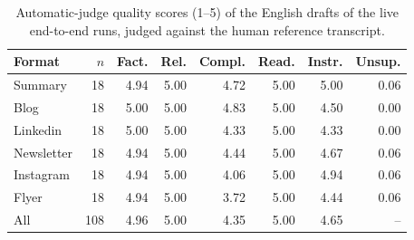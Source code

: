 \begin{table}[t]
\centering
\caption{Automatic-judge quality scores (1--5) of the English drafts of the live end-to-end runs, judged against the human reference transcript.}
\label{tab:quality}
\footnotesize
\setlength{\tabcolsep}{3.5pt}
\begin{tabular}{lrrrrrrr}
\toprule
Format & $n$ & Fact. & Rel. & Compl. & Read. & Instr. & Unsup. \\
\midrule
Summary & 18 & 4.94 & 5.00 & 4.72 & 5.00 & 5.00 & 0.06 \\
Blog & 18 & 5.00 & 5.00 & 4.83 & 5.00 & 4.50 & 0.00 \\
Linkedin & 18 & 5.00 & 5.00 & 4.33 & 5.00 & 4.33 & 0.00 \\
Newsletter & 18 & 4.94 & 5.00 & 4.44 & 5.00 & 4.67 & 0.06 \\
Instagram & 18 & 4.94 & 5.00 & 4.06 & 5.00 & 4.94 & 0.06 \\
Flyer & 18 & 4.94 & 5.00 & 3.72 & 5.00 & 4.44 & 0.06 \\
\midrule
All & 108 & 4.96 & 5.00 & 4.35 & 5.00 & 4.65 & -- \\
\bottomrule
\end{tabular}
\end{table}
